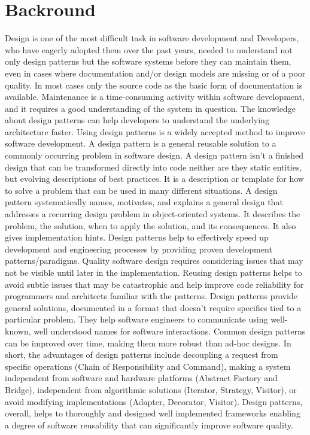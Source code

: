 \documentclass[12pt]{book}
\begin{document}
\section{Backround}
Design is one of the most difficult task in software development  and Developers, who have eagerly adopted them over the past years, needed to understand not only design patterns but the software systems before they can maintain them, even in cases where documentation and/or design models are missing or of a poor quality. In most cases only the source code as the basic form of documentation is available. Maintenance is a time-consuming activity within software development, and it requires a good understanding of the system in question. The knowledge about design patterns can help developers to understand the underlying architecture faster. Using design patterns is a widely accepted method to improve software development.
A design pattern is a general reusable solution to a commonly occurring  problem in software design. A design pattern isn't a finished design that can be transformed directly into code neither are they static entities, but evolving descriptions of best practices. It is a description or template for how to solve a problem that can be used in many different situations. A design pattern systematically names, motivates, and explains a general design that addresses a recurring design problem in object-oriented systems. It describes the problem, the solution, when to apply the solution, and its consequences. It also gives implementation hints.
Design patterns help to effectively speed up development and engineering processes by providing proven development patterns/paradigms. Quality software design requires considering issues that may not be visible until later in the implementation. Reusing design patterns helps to avoid subtle issues that may be catastrophic and help improve code reliability for programmers and architects familiar with the patterns. 
Design patterns provide general solutions, documented in a format that doesn't require specifics tied to a particular problem. They help software engineers to communicate using well-known, well understood names for software interactions. Common design patterns can be improved over time, making them more robust than ad-hoc designs. In short, the advantages of design patterns include decoupling a request from specific operations (Chain of Responsibility and Command), making a system independent from software and hardware platforms (Abstract Factory and Bridge), independent from algorithmic solutions (Iterator, Strategy, Visitor), or avoid modifying implementations (Adapter, Decorator, Visitor). Design patterns, overall, helps to thoroughly and designed well implemented frameworks enabling a degree of software reusability that can significantly improve software quality.
\end{document}
